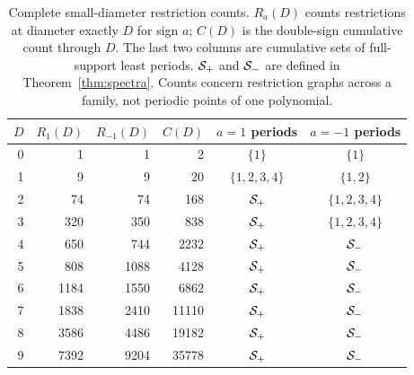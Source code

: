 \begin{table}[tb]
\centering
\caption{Complete small-diameter restriction counts. $R_a(D)$ counts
restrictions at diameter exactly $D$ for sign $a$; $C(D)$ is the
double-sign cumulative count through $D$. The last two columns are
cumulative sets of full-support least periods. $\mathcal S_+$ and $\mathcal S_-$
are defined in Theorem~\ref{thm:spectra}. Counts concern restriction
graphs across a family, not periodic points of one polynomial.}
\label{tab:small}
\small
\begin{tabular}{@{}rrrrcc@{}}
\toprule
$D$ & $R_1(D)$ & $R_{-1}(D)$ & $C(D)$ & $a=1$ periods & $a=-1$ periods\\
\midrule
0 & 1 & 1 & 2 & $\{1\}$ & $\{1\}$\\
1 & 9 & 9 & 20 & $\{1,2,3,4\}$ & $\{1,2\}$\\
2 & 74 & 74 & 168 & $\mathcal S_+$ & $\{1,2,3,4\}$\\
3 & 320 & 350 & 838 & $\mathcal S_+$ & $\{1,2,3,4\}$\\
4 & 650 & 744 & 2232 & $\mathcal S_+$ & $\mathcal S_-$\\
5 & 808 & 1088 & 4128 & $\mathcal S_+$ & $\mathcal S_-$\\
6 & 1184 & 1550 & 6862 & $\mathcal S_+$ & $\mathcal S_-$\\
7 & 1838 & 2410 & 11110 & $\mathcal S_+$ & $\mathcal S_-$\\
8 & 3586 & 4486 & 19182 & $\mathcal S_+$ & $\mathcal S_-$\\
9 & 7392 & 9204 & 35778 & $\mathcal S_+$ & $\mathcal S_-$\\
\bottomrule
\end{tabular}
\end{table}
